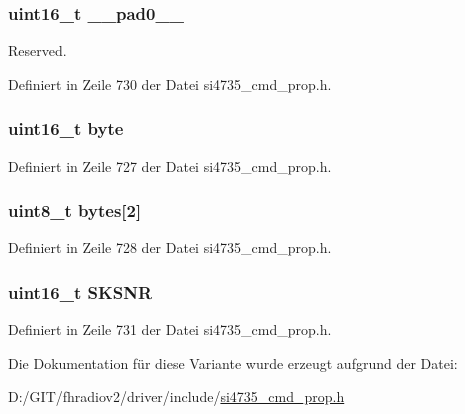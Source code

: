 \subsubsection[{\+\_\+\+\_\+pad0\+\_\+\+\_\+}]{\setlength{\rightskip}{0pt plus 5cm}uint16\+\_\+t \+\_\+\+\_\+pad0\+\_\+\+\_\+}\label{unionfm__seek__tune__snr__thres_a77132c2c26a75f5b8751b235cda23828}


Reserved. 



Definiert in Zeile 730 der Datei si4735\+\_\+cmd\+\_\+prop.\+h.

\hypertarget{unionfm__seek__tune__snr__thres_ab0549c1b5ea980a02e7eab77e21fea49}{}
\subsubsection[{byte}]{\setlength{\rightskip}{0pt plus 5cm}uint16\+\_\+t byte}\label{unionfm__seek__tune__snr__thres_ab0549c1b5ea980a02e7eab77e21fea49}


Definiert in Zeile 727 der Datei si4735\+\_\+cmd\+\_\+prop.\+h.

\hypertarget{unionfm__seek__tune__snr__thres_a46e4c05d20a047ec169f60d3167e912e}{}
\subsubsection[{bytes}]{\setlength{\rightskip}{0pt plus 5cm}uint8\+\_\+t bytes\mbox{[}2\mbox{]}}\label{unionfm__seek__tune__snr__thres_a46e4c05d20a047ec169f60d3167e912e}


Definiert in Zeile 728 der Datei si4735\+\_\+cmd\+\_\+prop.\+h.

\hypertarget{unionfm__seek__tune__snr__thres_aa9c8e1fe1b7fa73e35c29242c74fc247}{}
\subsubsection[{S\+K\+S\+N\+R}]{\setlength{\rightskip}{0pt plus 5cm}uint16\+\_\+t S\+K\+S\+N\+R}\label{unionfm__seek__tune__snr__thres_aa9c8e1fe1b7fa73e35c29242c74fc247}


Definiert in Zeile 731 der Datei si4735\+\_\+cmd\+\_\+prop.\+h.



Die Dokumentation für diese Variante wurde erzeugt aufgrund der Datei\+:\begin{DoxyCompactItemize}
\item 
D\+:/\+G\+I\+T/fhradiov2/driver/include/\hyperlink{si4735__cmd__prop_8h}{si4735\+\_\+cmd\+\_\+prop.\+h}\end{DoxyCompactItemize}
